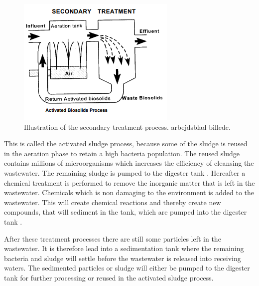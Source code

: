 \begin{figure}[H]
\centering
\includegraphics[width=.6\textwidth]{report/introduction/pictures/secondary_treatment.png}
\caption{Illustration of the secondary treatment process. arbejdsblad billede. }
\label{fig:secondary_treatment}%
\end{figure} 
This is called the activated sludge process, because some of the sludge is reused in the aeration phase to retain a high bacteria population. %
The reused sludge contains millions of microorganisms which increases the efficiency of cleansing the wastewater. The remaining sludge is pumped to the digester tank \cite{epa_wwtp}.
Hereafter a chemical treatment is performed to remove the inorganic matter that is left in the wastewater. Chemicals which is non damaging to the environment is added to the wastewater.
This will create chemical reactions and thereby create new compounds, that will sediment in the tank, which are pumped into the digester tank \cite{youtube_wastewater}.  

After these treatment processes there are still some particles left in the wastewater. It is therefore lead into a sedimentation tank where the remaining bacteria and sludge will settle before the wastewater is released into receiving waters. The sedimented particles or sludge will either be pumped to the digester tank for further processing or reused in the activated sludge process.


